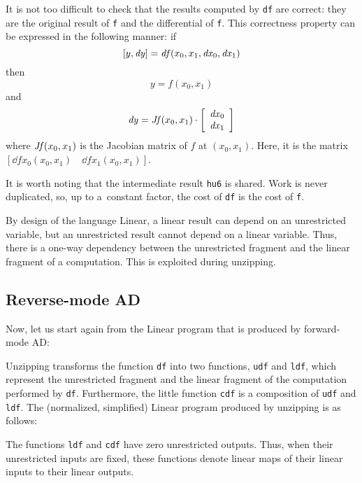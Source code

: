 \documentclass{article}
\begin{document}
It is not too difficult to check that the results computed by \texttt{df} are
correct: they are the original result of \texttt{f} and the differential of
\texttt{f}. This correctness property can be expressed in the following manner:
%
if \[[y, \mathit{dy}] = \mathit{df}(x_0, x_1, \mathit{dx}_0, \mathit{dx}_1)\]
then \[y=f(x_0, x_1)\]
and \[\mathit{dy}=\mathit{Jf}(x_0,x_1) \cdot \left[\begin{array}{c}\mathit{dx}_0\\\mathit{dx}_1\end{array}\right]\]
where
$\mathit{Jf}(x_0, x_1)$ is the Jacobian matrix of $f$ at $(x_0, x_1)$.
Here, it is the matrix $[ \dd{f}{x_0}(x_0, x_1) \quad \dd{f}{x_1}(x_0, x_1) ]$.

It is worth noting that the intermediate result \texttt{hu6} is shared. Work
is never duplicated, so, up to a~constant factor, the cost of \texttt{df} is
the cost of \texttt{f}.

By design of the language Linear, a linear result can depend on an
unrestricted variable, but an unrestricted result cannot depend on a linear
variable. Thus, there is a one-way dependency between the unrestricted
fragment and the linear fragment of a computation. This is exploited during
unzipping.

\subsection{Reverse-mode AD}
\label{sec:example:rmad}

Now, let us start again from the Linear program that is produced by
forward-mode AD:

\begin{mdframed}[backgroundcolor=gray!10,linewidth=0pt]

\end{mdframed}

Unzipping transforms the function \texttt{df} into two functions, \texttt{udf}
and \texttt{ldf}, which represent the unrestricted fragment and the linear
fragment of the computation performed by \texttt{df}. Furthermore, the little
function \texttt{cdf} is a composition of \texttt{udf} and \texttt{ldf}. The
(normalized, simplified) Linear program produced by unzipping is as follows:

\begin{mdframed}[backgroundcolor=gray!10,linewidth=0pt]

\end{mdframed}

The functions \texttt{ldf} and \texttt{cdf} have zero unrestricted outputs.
Thus, when their unrestricted inputs are fixed, these functions denote linear
maps of their linear inputs to their linear outputs.
\end{document}
